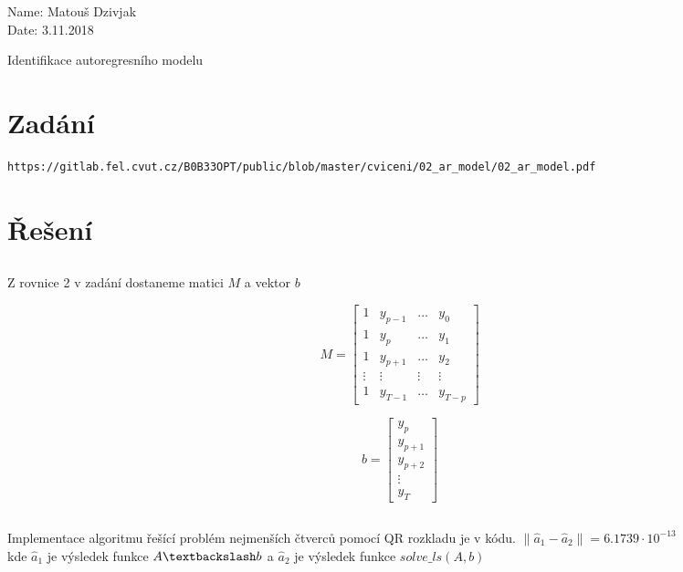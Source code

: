 \documentclass[10pt,a4paper,openright]{article}
\newcommand{\norm}[1]{\left\lVert#1\right\rVert}
\begin{document}
	\begin{flushleft}
		\large Name: Matouš Dzivjak\\
		\large Date: 3.11.2018\\
	\end{flushleft}
\begin{center}
	\huge Identifikace autoregresního modelu
\end{center}
\section{Zadání}
\begin{verbatim}
https://gitlab.fel.cvut.cz/B0B33OPT/public/blob/master/cviceni/02_ar_model/02_ar_model.pdf
\end{verbatim}


\section{Řešení}
\subsection{}
\begin{center}
Z rovnice 2 v zadání dostaneme matici $M$ a vektor $b$
\end{center}

\[M=
\begin{bmatrix}
1 & y_{p-1} & \dots & y_{0} \\
1 & y_{p} & \dots & y_{1}  \\
1 & y_{p+1} & \dots & y_{2}\\
\vdots & \vdots & \vdots &\vdots \\
1 & y_{T-1} & \dots & y_{T-p}
\end{bmatrix}\]

\[b=
\begin{bmatrix}
y_{p} \\
 y_{p+1}  \\
 y_{p+2}\\
\vdots \\
 y_{T}
\end{bmatrix}\]

\subsection{}
\begin{center}
Implementace algoritmu řešící problém nejmenších čtverců pomocí QR rozkladu je v kódu.
$\norm{\hat{a}_{1} - \hat{a}_{2}} = 6.1739 \cdot 10^{-13}$ \\
kde $\hat{a}_{1}$ je výsledek funkce $A\textbackslash b$ a $\hat{a}_{2}$ je výsledek funkce $solve\_ls\left(A,b\right)$
\end{center}
\end{document}
